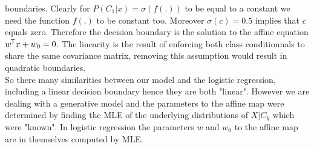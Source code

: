 boundaries.
Clearly for $P(C_1\vert x) = \sigma(f(.))$ to be equal to a constant we need the 
function $f(.)$ to be constant too. Moreover $\sigma(c) = 0.5$ implies 
that $c$ equals zero. Therefore the decision boundary is the solution to
the affine equation $w^{\mkern-1.5mu\mathsf{T}} x + w_0 = 0$. The linearity is the result of
enforcing both class conditionnals to share the same covariance matrix, 
removing this assumption would result in quadratic boundaries.\\
So there many similarities between our model and the logistic regression,
including a linear decision boundary hence they are both "linear".
However we are dealing with a generative model and the parameters 
to the affine map were determined by finding the MLE of the underlying
distributions of $X \vert C_k$ which were "known". 
In logistic regression the parameters $w$ and $w_0$ to the affine map
are in themselves computed by MLE. 
\clearpage

\clearpage
% 





